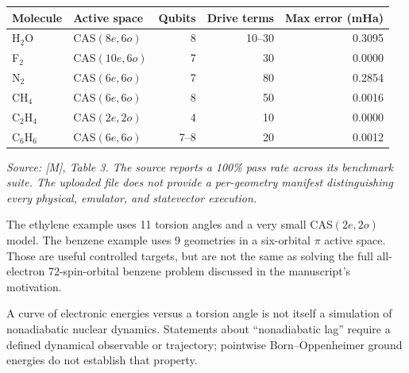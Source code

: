 \documentclass[11pt,a4paper,oneside]{report}
\begin{document}
\begin{center}
\small
\begin{tabularx}{\linewidth}{@{}lYrrr@{}}
\toprule Molecule & Active space & Qubits & Drive terms & Max error (mHa)\\\midrule
H$_2$O & CAS$(8e,6o)$ &8&10--30&0.3095\\
F$_2$ & CAS$(10e,6o)$ &7&30&0.0000\\
N$_2$ & CAS$(6e,6o)$ &7&80&0.2854\\
CH$_4$ & CAS$(6e,6o)$ &8&50&0.0016\\
C$_2$H$_4$ & CAS$(2e,2o)$ &4&10&0.0000\\
C$_6$H$_6$ & CAS$(6e,6o)$ &7--8&20&0.0012\\\bottomrule
\end{tabularx}
\end{center}
\textit{Source: [M], Table 3. The source reports a 100\% pass rate across its benchmark suite. The uploaded file does not provide a per-geometry manifest distinguishing every physical, emulator, and statevector execution.}

The ethylene example uses 11 torsion angles and a very small CAS$(2e,2o)$ model. The benzene example uses 9 geometries in a six-orbital $\pi$ active space. Those are useful controlled targets, but are not the same as solving the full all-electron 72-spin-orbital benzene problem discussed in the manuscript's motivation.

A curve of electronic energies versus a torsion angle is not itself a simulation of nonadiabatic nuclear dynamics. Statements about ``nonadiabatic lag'' require a defined dynamical observable or trajectory; pointwise Born--Oppenheimer ground energies do not establish that property.
\end{document}
